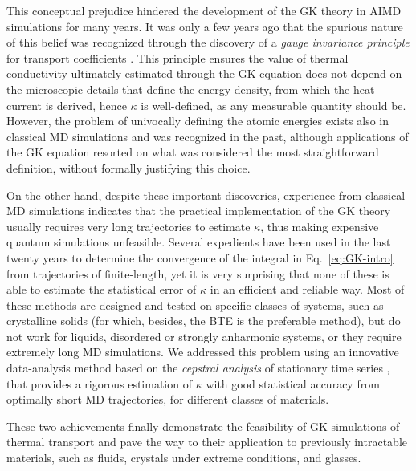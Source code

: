 This conceptual prejudice hindered the development of the GK theory in AIMD simulations for many years. It was only a few years ago that the spurious nature of this belief was recognized through the discovery of a \emph{gauge invariance principle} for transport coefficients \cite{Marcolongo2016,Ercole2016}. 
This principle ensures the value of thermal conductivity ultimately estimated through the GK equation does not depend on the microscopic details that define the energy density, from which the heat current is derived, hence $\kappa$ is well-defined, as any measurable quantity should be. 
However, the problem of univocally defining the atomic energies exists also in classical MD simulations and was recognized in the past, although applications of the GK equation resorted on what was considered the most straightforward definition, without formally justifying this choice. 

On the other hand, despite these important discoveries, experience from classical MD simulations indicates that the practical implementation of the GK theory usually requires very long trajectories to estimate $\kappa$, thus making expensive quantum simulations unfeasible. 
Several expedients have been used in the last twenty years to determine the convergence of the integral in Eq.~\eqref{eq:GK-intro} from trajectories of finite-length, yet it is very surprising that none of these is able to estimate the statistical error of $\kappa$ in an efficient and reliable way. Most of these methods are designed and tested on specific classes of systems, such as crystalline solids (for which, besides, the BTE is the preferable method), but do not work for liquids, disordered or strongly anharmonic systems, or they require extremely long MD simulations. 
We addressed this problem using an innovative data-analysis method based on the \emph{cepstral analysis} of stationary time series \cite{Ercole2017}, that provides a rigorous estimation of $\kappa$ with good statistical accuracy from optimally short MD trajectories, for different classes of materials. 

These two achievements finally demonstrate the feasibility of \abinitio GK simulations of thermal transport and pave the way to their application to previously intractable materials, such as fluids, crystals under extreme conditions, and glasses. 


